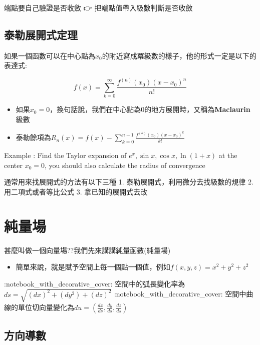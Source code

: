 \documentclass[
]{book}
\providecommand{\tightlist}{%
  \setlength{\itemsep}{0pt}\setlength{\parskip}{0pt}}
\begin{document}
端點要自己驗證是否收斂 👉 把端點值帶入級數判斷是否收斂

\hypertarget{ux6cf0ux52d2ux5c55ux958bux5f0fux5b9aux7406}{%
\subsection{泰勒展開式定理}\label{ux6cf0ux52d2ux5c55ux958bux5f0fux5b9aux7406}}

如果一個函數可以在中心點為\(x_0\)的附近寫成冪級數的樣子，他的形式一定是以下的表達式:

\[f(x) = \sum_{k = 0}^{\infty}\frac{f^{(n)}(x_0)(x-x_0)^n}{n!}\]

\begin{itemize}
\tightlist
\item
  如果\(x_0 = 0\)，換句話說，我們在中心點為\(0\)的地方展開時，又稱為\textbf{Maclaurin}級數
\item
  泰勒餘項為\(\displaystyle R_n(x) = f(x) - \sum_{k=0}^{n-1}\frac{f^{(k)}(x_0)(x-x_0)^k}{k!}\)
\end{itemize}

Example : Find the Taylor expansion of \(e^x,\sin x,\cos x, \ln (1+x)\) at the center \(x_0 = 0\), you should also calculate the radius of convergence

通常用來找展開式的方法有以下三種
1. 泰勒展開式，利用微分去找級數的規律
2. 用二項式或者等比公式
3. 拿已知的展開式去改

\hypertarget{ux7d14ux91cfux5834}{%
\section{純量場}\label{ux7d14ux91cfux5834}}

甚麼叫做一個向量場??我們先來講講純量函數(純量場)

\begin{itemize}
\tightlist
\item
  簡單來說，就是賦予空間上每一個點一個值，例如\(f(x,y,z) = x^2 + y^2 + z^2\)
\end{itemize}

:notebook\_with\_decorative\_cover: 空間中的弧長變化率為\(ds = \sqrt{(dx)^2 + (dy^2) + (dz)^2}\)
:notebook\_with\_decorative\_cover: 空間中曲線的單位切向量變化為\(du = (\frac{dx}{ds},\frac{dy}{ds},\frac{dz}{ds})\)

\hypertarget{ux65b9ux5411ux5c0eux6578}{%
\subsection{方向導數}\label{ux65b9ux5411ux5c0eux6578}}
\end{document}
